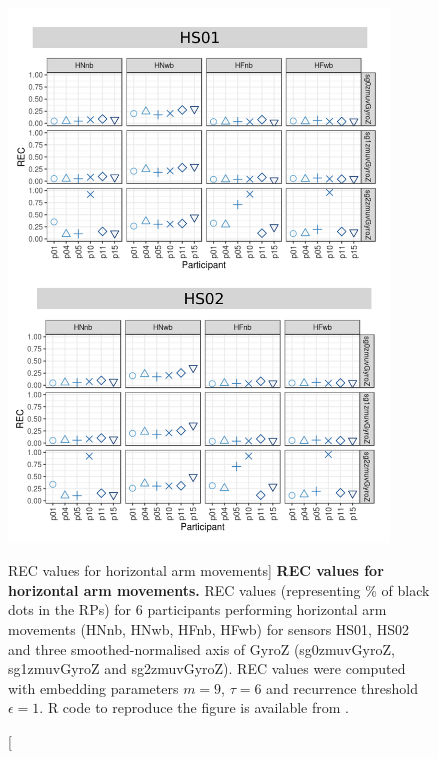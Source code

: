 \begin{figure}
\centering
\includegraphics[width=0.9\textwidth]{rqa_rec_H_w500}
    \caption
	[REC values for horizontal arm movements]{
	{\bf REC values for horizontal arm movements.}	
	REC values (representing \% of black dots in the RPs) for 
	6 participants performing horizontal arm movements 
	(HNnb, HNwb, HFnb, HFwb)
	for sensors HS01, HS02 and three smoothed-normalised axis 
	of GyroZ (sg0zmuvGyroZ, sg1zmuvGyroZ and sg2zmuvGyroZ).
	REC values were computed with 
	embedding parameters $m=9$, $\tau=6$ and recurrence threshold
	$\epsilon=1$.
	R code to reproduce the figure is available from \cite{xochicale2018}.
        }
    \label{fig:rqa_rec_H}
\end{figure}
